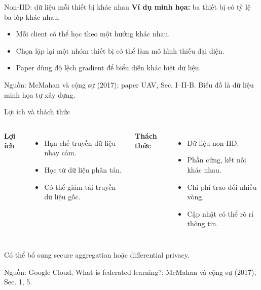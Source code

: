 \documentclass[10pt,aspectratio=43]{beamer}
\newcommand{\source}[1]{\par\vfill{\fontsize{5.8}{7}\selectfont\color{Muted}Nguồn: #1\par}}
\begin{document}
\begin{frame}[t]{Non-IID: dữ liệu mỗi thiết bị khác nhau}
\relax
\textbf{Ví dụ minh họa:} ba thiết bị có tỷ lệ ba lớp khác nhau.
\par\bigskip
\centering
{}
\par\medskip\raggedright
\begin{itemize}
\item Mỗi client có thể học theo một hướng khác nhau.
\item Chọn lặp lại một nhóm thiết bị có thể làm mô hình thiếu đại diện.
\item Paper dùng độ lệch gradient để biểu diễn khác biệt dữ liệu.
\end{itemize}
\source{McMahan và cộng sự (2017); paper UAV, Sec. I--II-B. Biểu đồ là dữ liệu minh họa tự xây dựng.}
\end{frame}

\begin{frame}[t]{Lợi ích và thách thức}
\relax
\begin{columns}[T,onlytextwidth]
\textcolor{HustRed}{\textbf{Lợi ích}}
\begin{itemize}
\item Hạn chế truyền dữ liệu nhạy cảm.
\item Học từ dữ liệu phân tán.
\item Có thể giảm tải truyền dữ liệu gốc.
\end{itemize}
\textcolor{HustRed}{\textbf{Thách thức}}
\begin{itemize}
\item Dữ liệu non-IID.
\item Phần cứng, kết nối khác nhau.
\item Chi phí trao đổi nhiều vòng.
\item Cập nhật có thể rò rỉ thông tin.
\end{itemize}
\end{columns}
\par\bigskip
Có thể bổ sung secure aggregation hoặc differential privacy.
\source{Google Cloud, What is federated learning?; McMahan và cộng sự (2017), Sec. 1, 5.}
\end{frame}
\end{document}
